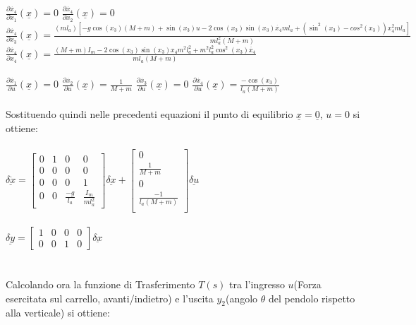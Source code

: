 $\displaystyle\frac{\partial{\dot{x_4}}}{\partial{x_1}}(\underline{x})=0$\quad
$\displaystyle\frac{\partial{\dot{x_4}}}{\partial{x_2}}(\underline{x})=0$\\
$\displaystyle\frac{\partial{\dot{x_4}}}{\partial{x_3}}(\underline{x})=\displaystyle\frac{(ml_a)[-g\cos(x_3)(M+m)+\sin(x_3)u-2\cos(x_3)\sin(x_3)\dot{x_4}ml_a+(\sin^2(x_3)-cos^2(x_3))x^2_4ml_a]}{ml_a^2(M+m)}$\quad
$\displaystyle\frac{\partial{\dot{x_4}}}{\partial{x_4}}(\underline{x})=\displaystyle\frac{(M+m)I_m-2\cos(x_3)\sin(x_3)x_4m^2l_a^2+m^2l_a^2\cos^2(x_3)\ddot{x_4}}{ml_a(M+m)}$\\\\
$\displaystyle\frac{\partial{\dot{x_1}}}{\partial{u}}(\underline{x})=0$\quad
$\displaystyle\frac{\partial{\dot{x_2}}}{\partial{u}}(\underline{x})=\displaystyle\frac{1}{M+m}$\quad
$\displaystyle\frac{\partial{\dot{x_3}}}{\partial{u}}(\underline{x})=0$\quad
$\displaystyle\frac{\partial{\dot{x_4}}}{\partial{u}}(\underline{x})=\displaystyle\frac{-\cos(x_3)}{l_a(M+m)}$\\\\
Sostituendo quindi nelle precedenti equazioni il punto di equilibrio $\underline{x}=\underline{0}$, $u=0$ si ottiene:\\\\
$\underline{\delta\dot{x}}=
\begin{bmatrix}
0&1&0&0\\
0&0&0&0\\
0&0&0&1\\
0&0&\displaystyle\frac{-g}{l_a}&\displaystyle\frac{I_m}{ml_a^2}
\end{bmatrix}
\underline{\delta x}+
\begin{bmatrix}
0\\
\displaystyle\frac{1}{M+m}\\
0\\
\displaystyle\frac{-1}{l_a(M+m)}\\
\end{bmatrix}
\underline{\delta u}
$\\\\
$\underline{\delta y}=
\begin{bmatrix}
1&0&0&0\\
0&0&1&0
\end{bmatrix}
\underline{\delta x}
$\\\\\\
Calcolando ora la funzione di Trasferimento $T(s)$ tra l'ingresso $u$(Forza esercitata sul carrello,
avanti/indietro) e l'uscita $y_2$(angolo $\theta$ del pendolo rispetto alla verticale) si ottiene:\\\\
